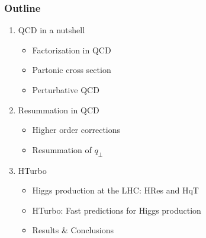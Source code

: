 \documentclass[aspectratio=43]{beamer}
\begin{document}
\begin{frame}

	\frametitle{Outline}
	
	\begin{enumerate}
		\item {\color{blue}QCD in a nutshell}
		\begin{itemize}
			\item Factorization in QCD
			\item Partonic cross section
			\item Perturbative QCD
		\end{itemize}
		\item {\color{blue}Resummation in QCD}
		\begin{itemize}
			\item Higher order corrections
			\item Resummation of $q_{\perp}$
		\end{itemize}
		\item {\color{blue}HTurbo}
		\begin{itemize}
			\item Higgs production at the LHC: HRes and HqT
			\item HTurbo: Fast predictions for Higgs production
			\item Results $\&$ Conclusions
		\end{itemize}
	\end{enumerate}
	
\end{frame}

\begin{frame}


\end{frame}
\end{document}
